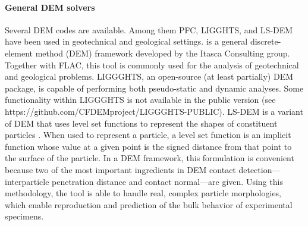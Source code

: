 \paragraph{General DEM solvers}
Several DEM codes are available. Among them PFC, LIGGHTS, and LS-DEM have been used in geotechnical and geological settings.
 is a general discrete-element method (DEM) framework developed by the Itasca Consulting group. Together with FLAC, this tool is commonly used for the analysis of geotechnical and geological problems.
LIGGGHTS, an open-source (at least partially) DEM package, is capable of performing both pseudo-static and dynamic analyses. Some functionality within LIGGGHTS is not available in the public version (see https://github.com/CFDEMproject/LIGGGHTS-PUBLIC). LS-DEM is a variant of DEM that uses level set functions to represent the shapes of constituent particles \citep{kawamoto2018}. When used to represent a particle, a level set function is an implicit function whose value at a given point is the signed distance from that point to the surface of the particle. In a DEM framework, this formulation is convenient because two of the most important ingredients in DEM contact detection---interparticle penetration distance and contact normal---are given. Using this methodology, the tool is able to handle real, complex particle morphologies, which enable reproduction and prediction of the bulk behavior of experimental specimens.

